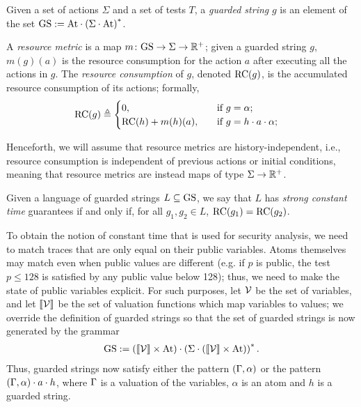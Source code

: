 \begin{definition}
Given a set of actions $\Sigma$ and a set of tests $T$, a \emph{guarded string} $g$ is an element of the set $\text{GS} := \text{At} \cdot \left(\Sigma\cdot \text{At}\right)^{*}$.
\end{definition}

\begin{definition}
A \emph{resource metric} is a map $m\colon \text{GS} \rightarrow \Sigma \rightarrow \mathbb{R}^{+}$; given a guarded string $g$, $m(g)(a)$ is the resource consumption for the action $a$ after executing all the actions in $g$. The \emph{resource consumption} of $g$, denoted $\text{RC}(g)$, is the accumulated resource consumption of its actions; formally,
\begin{align}
\text{RC}(g)&\triangleq 
\begin{cases}
0, &\quad \text{if $g=\alpha$;}\\
\text{RC}(h) + m(h)(a),&\quad \text{if $g=h \cdot a\cdot \alpha $;}\\
\end{cases}
\end{align}

Henceforth, we will assume that resource metrics are history-independent, i.e., resource consumption is independent of previous actions or initial conditions, meaning that resource metrics are instead maps of type $\Sigma \rightarrow \mathbb{R}^{+}$.  

\end{definition}

\begin{definition}
Given a language of guarded strings $L\subseteq \text{GS}$, we say that $L$ has \emph{strong constant time} guarantees if and only if, for all $g_1, g_2 \in L$, $\text{RC}(g_1)=\text{RC}(g_2)$. 
\end{definition}
To obtain the notion of constant time that is used for security analysis, we need to match traces that are only equal on their public variables. Atoms themselves may match even when public values are different (e.g. if $p$ is public, the test $p\leq 128$ is satisfied by any public value below 128); thus, we need to make the state of public variables explicit. For such purposes, let $\mathcal{V}$ be the set of variables, and let $\llbracket \mathcal{V}\rrbracket$ be the set of valuation functions which map variables to values; we override the definition of guarded strings so that the set of guarded strings is now generated by the grammar
\begin{align}
\text{GS} := \left(\llbracket \mathcal{V}\rrbracket\times\text{At}\right) \cdot \left(\Sigma\cdot \left(\llbracket \mathcal{V}\rrbracket\times\text{At}\right)\right)^{*}.
\end{align}
Thus, guarded strings now satisfy either the pattern $(\Gamma,\alpha)$ or the pattern $(\Gamma,\alpha)\cdot a\cdot h$, where $\Gamma$ is a valuation of the variables, $\alpha$ is an atom and $h$ is a guarded string.

